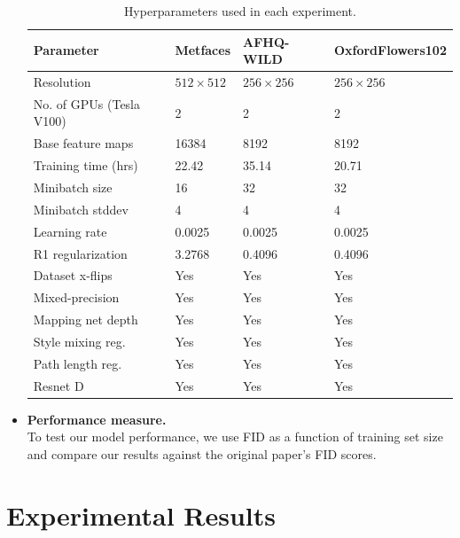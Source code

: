 \documentclass{report}
\begin{document}
\begin{itemize}
\begin{table}[!ht]
\caption{Hyperparameters used in each experiment.}
\centering 
\begin{tabular}{ |p{4cm}|p{1.8cm}|p{2.3cm}|p{2.9cm}| }
 \hline
 Parameter & Metfaces & AFHQ-WILD  & OxfordFlowers102\\
 \hline
 Resolution             & $512\times 512$   & $256\times 256$     & $256\times 256$\\
 No. of GPUs (Tesla V100)         & 2        & 2          & 2\\
 Base feature maps           & 16384    & 8192    & 8192\\
 Training time (hrs)  & 22.42    & 35.14      & 20.71\\
 Minibatch size         & 16       & 32         & 32\\
 Minibatch stddev       & 4        & 4         & 4\\
 Learning rate       & 0.0025      & 0.0025        & 0.0025\\
 R1 regularization      & 3.2768   & 0.4096     & 0.4096\\
 Dataset x-flips        & Yes      & Yes        & Yes\\
 Mixed-precision        & Yes      & Yes        & Yes\\
 Mapping net depth      & Yes      & Yes        & Yes\\
 Style mixing reg.      & Yes      & Yes        & Yes\\
 Path length reg.       & Yes      & Yes        & Yes\\
 Resnet D               & Yes      & Yes        & Yes\\
 \hline
\end{tabular}
\end{table}

\item \textbf{Performance measure.}\\
To test our model performance, we use FID as a function of training set size and compare our results against the original paper's FID scores.


\end{itemize}


\section{Experimental Results}
\label{sec:M3-results}
\end{document}
